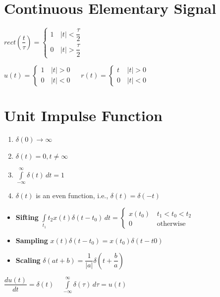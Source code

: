 \documentclass[]{article}
\date{}
\begin{document}
\begin{multicols}{2}
    \section*{Continuous Elementary Signal}
    \begin{spacing}{1.5}
        $rect(\dfrac{t}{\tau}) = \begin{cases}
                1\, & |t| < \dfrac{\tau}{2} \\
                0\, & |t| > \dfrac{\tau}{2}
            \end{cases}$\\
    \end{spacing}
    $u(t) = \begin{cases}
            1\, & |t| > 0 \\
            0\, & |t| < 0
        \end{cases}$ ~ $r(t) = \begin{cases}
            t\, & |t| > 0 \\
            0\, & |t| < 0
        \end{cases}$
    \section*{Unit Impulse Function}
    \begin{enumerate}
        \item $\delta(0) \rightarrow \infty$
        \item $\delta(t) = 0, t \neq \infty$
        \item $\int\limits_{-\infty}^{\infty} \delta(t)\, dt = 1$
        \item $\delta(t)$ is an even function, i.e., $\delta(t) = \delta(-t)$
    \end{enumerate}
    \begin{itemize}
        \item \textbf{Sifting} $\int\limits_{t_1}{t_2}x(t)\delta(t-t_0)\, dt = \begin{cases}
                      x(t_0)\, & t_1 < t_0 < t_2  \\
                      0\,      & \text{otherwise}
                  \end{cases}$
        \item \textbf{Sampling} $x(t)\delta(t-t_0) = x(t_0)\delta(t-t0)$
        \item \textbf{Scaling} $\delta(at+b) = \dfrac{1}{|a|} \delta(t + \dfrac{b}{a})$
    \end{itemize}
    $\dfrac{d u(t)}{dt} = \delta(t)$ ~ $\int\limits_{-\infty}^{\infty} \delta(\tau)\, d\tau = u(t)$

\end{multicols}
\end{document}
